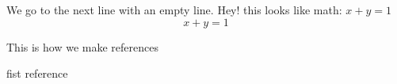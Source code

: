 \documentclass[preprint,12pt]{elsarticle}
\begin{document}
We go to the next line with an empty line.
Hey! this looks like math: $x+y=1$
$$x+y=1$$

This is how we make references \cite{testref}





\begin{thebibliography}{00}


fist reference

\end{thebibliography}
\end{document}
